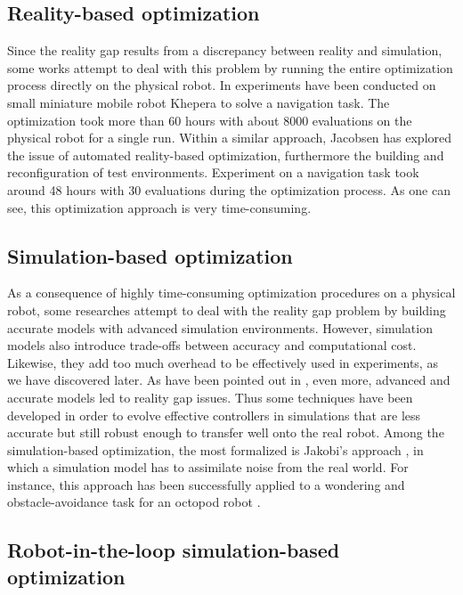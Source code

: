 \subsection{Reality-based optimization}

Since the reality gap results from a discrepancy between reality and simulation, some works attempt to deal with this problem by running the entire optimization process directly on the physical robot. In \cite{floreano1998evolutionary} experiments have been conducted on small miniature mobile robot Khepera \cite{mondada1999development} to solve a navigation task. The optimization took more than 60 hours with about 8000 evaluations on the physical robot for a single run. Within a similar approach, Jacobsen has explored the issue of automated reality-based optimization, furthermore the building and reconfiguration of test environments. Experiment on a navigation task took around 48 hours with 30 evaluations during the optimization process. As one can see, this optimization approach is very time-consuming.

\subsection{Simulation-based optimization}

As a consequence of highly time-consuming optimization procedures on a physical robot, some researches attempt to deal with the reality gap problem by building accurate models with advanced simulation environments. However, simulation models also introduce trade-offs between accuracy and computational cost. Likewise, they add too much overhead to be effectively used in experiments, as we have discovered later. As have been pointed out in \cite{mouret201720}, even more, advanced and accurate models led to reality gap issues. Thus some techniques have been developed in order to evolve effective controllers in simulations that are less accurate but still robust enough to transfer well onto the real robot. Among the simulation-based optimization, the most formalized is Jakobi's approach \cite{jakobi1995noise}, in which a simulation model has to assimilate noise from the real world. For instance, this approach has been successfully applied to a wondering and obstacle-avoidance task for an octopod robot \cite{jakobi1998running}.

\subsection{Robot-in-the-loop simulation-based optimization}

